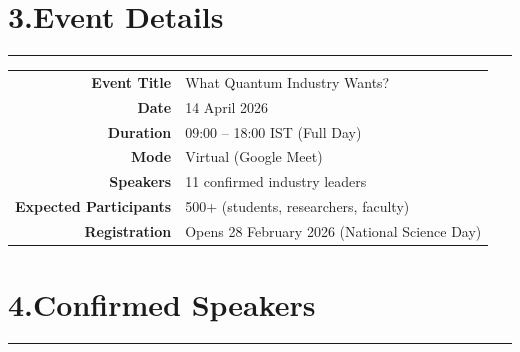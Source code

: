 \documentclass[12pt,a4paper]{article}
\begin{document}
\section*{3.\quad Event Details}
\vspace{-4pt}\hrule\vspace{6pt}

\begin{table}[h!]
\centering
\begin{tabular}{r l}
  \toprule
  \textbf{Event Title} & What Quantum Industry Wants? \\
  \textbf{Date}         & 14 April 2026 \\
  \textbf{Duration}     & 09:00 -- 18:00 IST (Full Day) \\
  \textbf{Mode}         & Virtual (Google Meet) \\
  \textbf{Speakers}     & 11 confirmed industry leaders \\
  \textbf{Expected Participants} & 500+ (students, researchers, faculty) \\
  \textbf{Registration}  & Opens 28 February 2026 (National Science Day) \\
  \bottomrule
\end{tabular}
\end{table}

\section*{4.\quad Confirmed Speakers}
\vspace{-4pt}\hrule\vspace{6pt}
\end{document}
